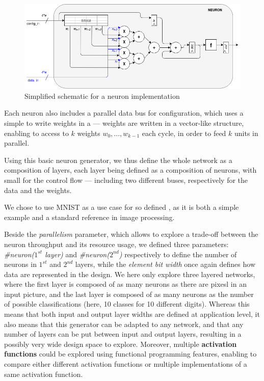         \begin{figure}[h!]
            \centering
            \includegraphics[width=1.0\textwidth]{Figures/neuron.png}
            \caption{Simplified schematic for a neuron implementation}
            \label{app.benchmark:sec.mlp:fig.neuron}
        \end{figure}

        Each neuron also includes a parallel data bus for configuration, which uses a simple  to write weights in a  --- weights are written in a vector-like structure, enabling to access to $k$ weights $w_0, ..., w_{k-1}$ each cycle, in order to feed $k$  units in parallel.
        
        Using this basic neuron generator, we thus define the whole network as a composition of layers, each layer being defined as a composition of neurons, with small  for the control flow --- including two different  buses, respectively for the data and the weights.

        We chose to use MNIST as a use case for so defined , as it is both a simple example and a standard reference in image processing.

        Beside the {\it parallelism} parameter, which allows to explore a trade-off between the neuron throughput and its resource usage, we defined three parameters: {\it \#neuron($1^{st}$ layer)} and {\it \#neuron($2^{nd}$)} respectively to define the number of neurons in $1^{st}$ and $2^{nd}$ layers, while the {\it element bit width} once again defines how data are represented in the design.
        We here only explore three layered networks, where the first layer is composed of as many neurons as there are pixesl in an input picture, and the last layer is composed of as many neurons as the number of possible classifications (here, 10 classes for 10 different digits).
        Whereas this means that both input and output layer widths are defined at application level, it also means that this generator can be adapted to any network, and that any number of layers can be put between input and output layers, resulting in a possibly very wide design space to explore.
        Moreover, multiple {\bf activation functions} could be explored using \scala{} functional programming features, enabling to compare either different activation functions or multiple implementations of a same activation function.

